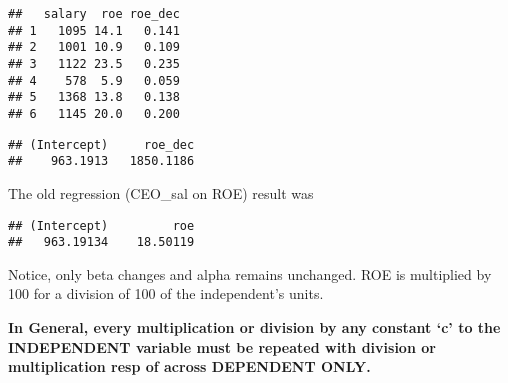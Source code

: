 \documentclass[
]{article}
\begin{document}
\begin{verbatim}
##   salary  roe roe_dec
## 1   1095 14.1   0.141
## 2   1001 10.9   0.109
## 3   1122 23.5   0.235
## 4    578  5.9   0.059
## 5   1368 13.8   0.138
## 6   1145 20.0   0.200
\end{verbatim}

\begin{verbatim}
## (Intercept)     roe_dec 
##    963.1913   1850.1186
\end{verbatim}

The old regression (CEO\_sal on ROE) result was

\begin{verbatim}
## (Intercept)         roe 
##   963.19134    18.50119
\end{verbatim}

Notice, only beta changes and alpha remains unchanged. ROE is multiplied
by 100 for a division of 100 of the independent's units.

\textbf{In General, every multiplication or division by any constant `c'
to the INDEPENDENT variable must be repeated with division or
multiplication resp of across DEPENDENT ONLY.}
\end{document}
